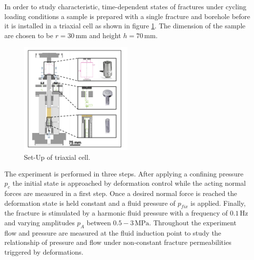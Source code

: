 In order to study characteristic, time-dependent states of fractures under cycling loading conditions a sample is prepared with a single fracture and borehole before it is installed in a triaxial cell as shown in figure \ref{fig:exp_cyclic_pressure_triax}. The dimension of the sample are chosen to be $r = 30 \, \text{mm}$ and height $h = 70 \, \text{mm}$. 
\begin{figure}[!ht]
\begin{center}
\includegraphics[width=0.5\textwidth]{./figures/exp_cyclic_pressure_triax.png}
\end{center}
\caption{Set-Up of triaxial cell.}
\label{fig:exp_cyclic_pressure_triax}
\end{figure}
The experiment is performed in three steps. After applying a confining pressure $p_{c}$ the initial state is approached by deformation control while the acting normal forces are measured in a first step. Once a desired normal force is reached the deformation state is held constant and a fluid pressure of $p_{fix}$ is applied. Finally, the fracture is stimulated by a harmonic fluid pressure with a frequency of $0.1 \, \text{Hz}$ and varying amplitudes $p_A$ between $0.5-3 \, \text{MPa}$. Throughout the experiment flow and pressure are measured at the fluid induction point to study the relationship of pressure and flow under non-constant fracture permeabilities triggered by deformations.